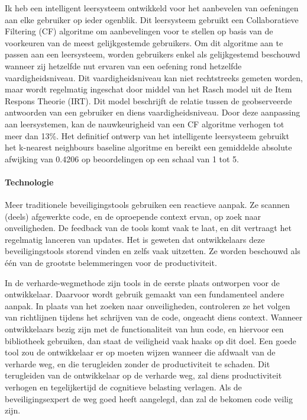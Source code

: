 Ik heb een intelligent leersysteem ontwikkeld voor het aanbevelen van oefeningen aan elke gebruiker op ieder ogenblik.
Dit leersysteem gebruikt een Collaboratieve Filtering (CF) algoritme om aanbevelingen voor te stellen op basis van de voorkeuren van de meest gelijkgestemde gebruikers.
Om dit algoritme aan te passen aan een leersysteem, worden gebruikers enkel als gelijkgestemd beschouwd wanneer zij hetzelfde nut ervaren van een oefening rond hetzelfde vaardigheidsniveau.
Dit vaardigheidsniveau kan niet rechtstreeks gemeten worden, maar wordt regelmatig ingeschat door middel van het Rasch model uit de Item Respons Theorie (IRT).
Dit model beschrijft de relatie tussen de geobserveerde antwoorden van een gebruiker en diens vaardigheidsniveau.
Door deze aanpassing aan leersystemen, kan de nauwkeurigheid van een CF algoritme verhogen tot meer dan 13\%.
Het definitief ontwerp van het intelligente leersysteem gebruikt het k-nearest neighbours baseline algoritme en bereikt een gemiddelde absolute afwijking van 0.4206 op beoordelingen op een schaal van 1 tot 5.

\paragraph{Technologie}
Meer traditionele beveiligingstools gebruiken een reactieve aanpak. Ze scannen (deels) afgewerkte code, en de oproepende context ervan, op zoek naar onveiligheden.
De feedback van de tools komt vaak te laat, en dit vertraagt het regelmatig lanceren van updates.
Het is geweten dat ontwikkelaars deze beveiligingstools storend vinden en zelfs vaak uitzetten.
Ze worden beschouwd als één van de grootste belemmeringen voor de productiviteit.

In de verharde-wegmethode zijn tools in de eerste plaats ontworpen voor de ontwikkelaar.
Daarvoor wordt gebruik gemaakt van een fundamenteel andere aanpak.
In plaats van het zoeken naar onveiligheden, controleren ze het volgen van richtlijnen tijdens het schrijven van de code, ongeacht diens context.
Wanneer ontwikkelaars bezig zijn met de functionaliteit van hun code, en hiervoor een bibliotheek gebruiken, dan staat de veiligheid vaak haaks op dit doel.
Een goede tool zou de ontwikkelaar er op moeten wijzen wanneer die afdwaalt van de verharde weg, en die terugleiden zonder de productiviteit te schaden.
Dit terugleiden van de ontwikkelaar op de verharde weg, zal diens productiviteit verhogen en tegelijkertijd de cognitieve belasting verlagen.
Als de beveiligingsexpert de weg goed heeft aangelegd, dan zal de bekomen code veilig zijn.

